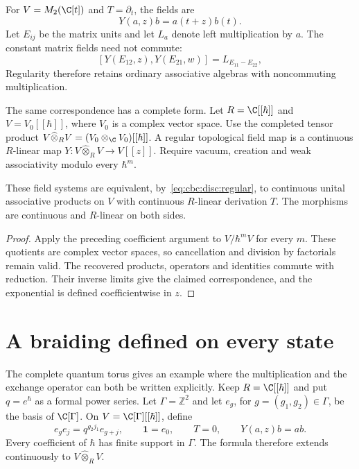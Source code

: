 For $V=M_2(\C[t])$ and $T=\partial_t$, the fields are
\[
 Y(a,z)b=a(t+z)b(t).
\]
Let $E_{ij}$ be the matrix units and let $L_a$ denote left multiplication by $a$.
The constant matrix fields need not commute:
\[
 [Y(E_{12},z),Y(E_{21},w)]=L_{E_{11}-E_{22}},
\]
Regularity therefore retains ordinary associative algebras with noncommuting multiplication.

The same correspondence has a complete form.
Let $R=\C[[\hbar]]$ and $V=V_0[[\hbar]]$, where $V_0$ is a complex vector space.
Use the completed tensor product
$V\widehat\otimes_R V=(V_0\otimes_{\C}V_0)[[\hbar]]$.
A regular topological field map is a continuous $R$-linear map
$Y:V\widehat\otimes_R V\to V[[z]]$.
Require vacuum, creation and weak associativity modulo every $\hbar^m$.

\begin{corollary}\label{cbc:disc:complete-regular}
These field systems are equivalent, by~\eqref{eq:cbc:disc:regular}, to continuous unital associative products on $V$ with continuous $R$-linear derivation $T$.
The morphisms are continuous and $R$-linear on both sides.
\end{corollary}
\begin{proof}
Apply the preceding coefficient argument to $V/\hbar^mV$ for every $m$.
These quotients are complex vector spaces, so cancellation and division by factorials remain valid.
The recovered products, operators and identities commute with reduction.
Their inverse limits give the claimed correspondence, and the exponential is defined coefficientwise in $z$.
\end{proof}

\section{A braiding defined on every state}
The complete quantum torus gives an example where the multiplication and the exchange operator can both be written explicitly.
Keep $R=\C[[\hbar]]$ and put $q=e^\hbar$ as a formal power series.
Let $\Gamma=\mathbb Z^2$ and let $e_g$, for $g=(g_1,g_2)\in\Gamma$, be the basis of $\C[\Gamma]$.
On $V=\C[\Gamma][[\hbar]]$, define
\begin{equation}\label{eq:cbc:disc:torus-product}
 e_g e_j=q^{g_2j_1}e_{g+j},\qquad \mathbf1=e_0,
 \qquad T=0,\qquad Y(a,z)b=ab.
\end{equation}
Every coefficient of $\hbar$ has finite support in $\Gamma$.
The formula therefore extends continuously to $V\widehat\otimes_R V$.

